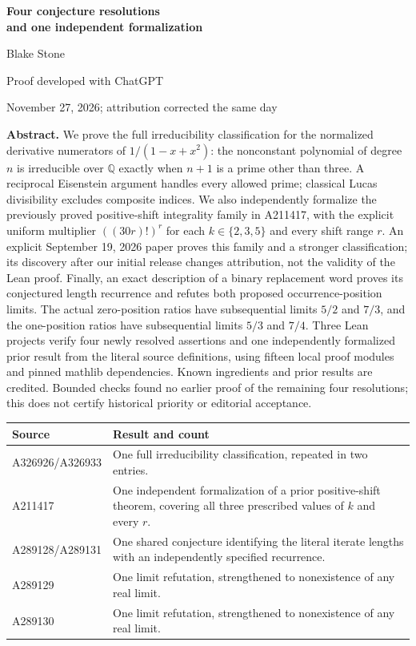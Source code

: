 \documentclass[11pt]{article}
\newcommand{\Q}{\mathbb Q}
\begin{document}
\begin{center}
{\LARGE\bfseries Four conjecture resolutions\\[3pt]and one independent formalization}\par
\vspace{0.5em}
{\large Blake Stone}\par
Proof developed with ChatGPT\par
November 27, 2026; attribution corrected the same day
\end{center}

\textbf{Abstract.}
We prove the full irreducibility classification for the normalized
derivative numerators of $1/(1-x+x^2)$: the nonconstant polynomial of
degree $n$ is irreducible over $\Q$ exactly when $n+1$ is a prime other
than three. A reciprocal Eisenstein argument handles every allowed
prime; classical Lucas divisibility excludes composite indices.
We also independently formalize the previously proved positive-shift
integrality family in A211417, with the explicit uniform multiplier
$((30r)!)^r$ for each $k\in\{2,3,5\}$ and every shift range $r$.
An explicit September 19, 2026 paper proves this family and a stronger
classification; its discovery after our initial release changes
attribution, not the validity of the Lean proof.
Finally, an exact description of a binary replacement word proves
its conjectured length recurrence and refutes both proposed
occurrence-position limits. The actual zero-position ratios have
subsequential limits $5/2$ and $7/3$, and the one-position ratios
have subsequential limits $5/3$ and $7/4$.
Three Lean projects verify four newly resolved assertions and one
independently formalized prior result from the literal source
definitions, using fifteen local proof modules and pinned mathlib
dependencies. Known ingredients and prior results are credited.
Bounded checks found no earlier proof of the remaining four
resolutions; this does not certify historical priority or
editorial acceptance.

\begin{center}
\begin{tabular}{@{}l>{\raggedright\arraybackslash}p{4.55in}@{}}
\toprule
Source & Result and count\\
\midrule
A326926/A326933 & One full irreducibility classification, repeated in two entries.\\
A211417 & One independent formalization of a prior positive-shift theorem, covering all three prescribed values of $k$ and every $r$.\\
A289128/A289131 & One shared conjecture identifying the literal iterate lengths with an independently specified recurrence.\\
A289129 & One limit refutation, strengthened to nonexistence of any real limit.\\
A289130 & One limit refutation, strengthened to nonexistence of any real limit.\\
\bottomrule
\end{tabular}
\end{center}
\end{document}
